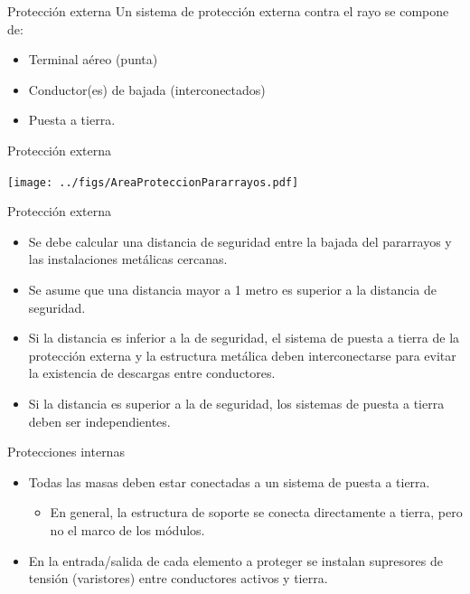 \documentclass[aspectratio=169, usenames,svgnames,dvipsnames]{beamer}
\begin{document}
\begin{frame}[label={sec:orga2dd2f4}]{Protección externa}
Un sistema de protección externa contra el rayo se compone de:

\begin{itemize}
\item Terminal aéreo (punta)

\item Conductor(es) de bajada (interconectados)

\item Puesta a tierra.
\end{itemize}
\end{frame}

\begin{frame}[label={sec:org2e05e2b}]{Protección externa}
\begin{center}
\texttt{[image: ../figs/AreaProteccionPararrayos.pdf]}
\end{center}
\end{frame}

\begin{frame}[label={sec:org3da16ce}]{Protección externa}
\begin{itemize}
\item Se debe calcular una \alert{distancia de seguridad} entre la bajada del
pararrayos y las instalaciones metálicas cercanas.

\item Se asume que una distancia mayor a 1 metro es superior a la distancia
de seguridad.

\item \alert{Si la distancia es inferior a la de seguridad}, el sistema de puesta
a tierra de la protección externa y la estructura metálica deben
\alert{interconectarse} para evitar la existencia de descargas entre
conductores.

\item \alert{Si la distancia es superior a la de seguridad}, los sistemas de
puesta a tierra deben ser \alert{independientes}.
\end{itemize}
\end{frame}

\begin{frame}[label={sec:orgeea63bc}]{Protecciones internas}
\begin{itemize}
\item \alert{Todas las masas deben estar conectadas a un sistema de puesta a
tierra}.

\begin{itemize}
\item En general, la estructura de soporte se conecta directamente
a tierra, pero no el marco de los módulos.
\end{itemize}

\item En la entrada/salida de cada elemento a proteger se instalan
\alert{supresores de tensión (varistores)} entre conductores activos y
tierra.
\end{itemize}
\end{frame}
\end{document}
